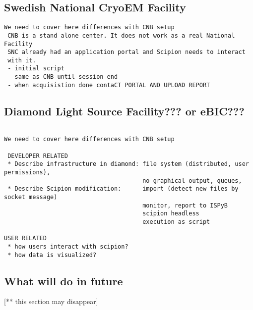 \subsection{Swedish National CryoEM Facility}

\begin{verbatim}
We need to cover here differences with CNB setup
 CNB is a stand alone center. It does not work as a real National Facility
 SNC already had an application portal and Scipion needs to interact
 with it. 
 - initial script
 - same as CNB until session end
 - when acquisistion done contaCT PORTAL AND UPLOAD REPORT
\end{verbatim}

\subsection{Diamond Light Source Facility??? or eBIC???}

\begin{verbatim}
 
We need to cover here differences with CNB setup

 DEVELOPER RELATED
 * Describe infrastructure in diamond: file system (distributed, user permissions),
                                       no graphical output, queues, 
 * Describe Scipion modification:      import (detect new files by socket message)
                                       monitor, report to ISPyB 
                                       scipion headless
                                       execution as script

USER RELATED
 * how users interact with scipion?
 * how data is visualized?
\end{verbatim}





\subsection{What will do in future}
[** this section may disappear] 


